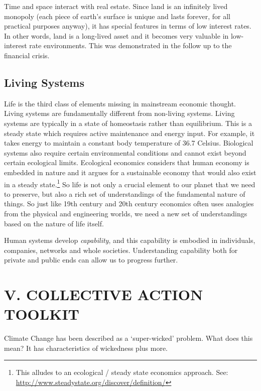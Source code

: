 \documentclass[]{tufte-handout}
\begin{document}
Time and space interact with real estate. Since land is an infinitely
lived monopoly (each piece of earth's surface is unique and lasts
forever, for all practical purposes anyway), it has special features in
terms of low interest rates. In other words, land is a long-lived asset
and it becomes very valuable in low-interest rate environments. This was
demonstrated in the follow up to the financial crisis.

\hypertarget{living-systems}{%
\subsection{Living Systems}\label{living-systems}}

Life is the third class of elements missing in mainstream economic
thought. Living systems are fundamentally different from non-living
systems. Living systems are typically in a state of homeostasis rather
than equilibrium. This is a steady state which requires active
maintenance and energy input. For example, it takes energy to maintain a
constant body temperature of 36.7 Celsius. Biological systems also
require certain environmental conditions and cannot exist beyond certain
ecological limits. Ecological economics considers that human economy is
embedded in nature and it argues for a sustainable economy that would
also exist in a steady state.\footnote{This alludes to an ecological /
  steady state economics approach. See:
  \url{http://www.steadystate.org/discover/definition/}} So life is not
only a crucial element to our planet that we need to preserve, but also
a rich set of understandings of the fundamental nature of things. So
just like 19th century and 20th century economics often uses analogies
from the physical and engineering worlds, we need a new set of
understandings based on the nature of life itself.

Human systems develop \emph{capability}, and this capability is embodied
in individuals, companies, networks and whole societies. Understanding
capability both for private and public ends can allow us to progress
further.

\newpage

\hypertarget{v.-collective-action-toolkit}{%
\section{V. COLLECTIVE ACTION
TOOLKIT}\label{v.-collective-action-toolkit}}

Climate Change has been described as a `super-wicked' problem. What does
this mean? It has characteristics of wickedness plus more.
\end{document}

